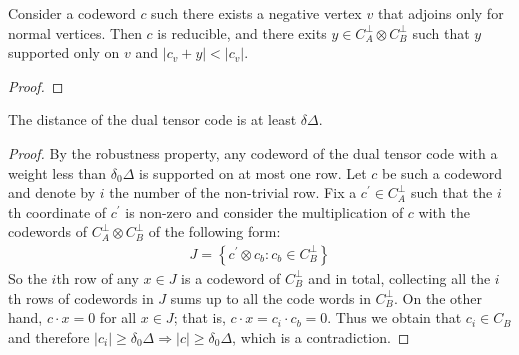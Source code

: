 \begin{claim}
  Consider a codeword $c$ such there exists a negative vertex $v$ that adjoins only for normal vertices. Then $c$ is reducible, and there exits $y \in C_{A}^{\perp}\otimes C_{B}^{\perp}$ such that $y$ supported only on $v$ and $ | c_{v} + y | < |c_{v}| $.       
\end{claim}

\begin{proof}
\end{proof}




\begin{claim}
  The distance of the dual tensor code is at least $\delta\Delta$.
\end{claim}
\begin{proof}
By the robustness property, any codeword of the dual tensor code with a weight less than $\delta_{0}\Delta$ is supported on at most one row. Let $c$ be such a codeword and denote by $i$ the number of the non-trivial row. Fix a $c^{\prime} \in C_{A}^{\perp}$ such that the $i$th coordinate of  $c^{\prime}$ is non-zero and consider the multiplication of $c$ with the codewords of $C_{A}^\perp \otimes C_{B}^\perp$ of the following form:
  \begin{equation*}
    \begin{split}
      J = \left\{ c^{\prime} \otimes c_{b} : c_{b}\in C_{B}^{\perp} \right\} 
    \end{split}
  \end{equation*}
  So the $i$th row of any $x \in J$ is a codeword of $C_{B}^{\perp}$ and in total, collecting all the $i$th rows of codewords in $J$ sums up to all the code words in $C_{B}^{\perp}$. On the other hand, $c\cdot x = 0$ for all $x \in J$; that is, $c\cdot x = c_{i} \cdot c_{b} = 0$. Thus we obtain that $c_{i} \in C_{B}$ and therefore $|c_{i}| \ge \delta_{0}\Delta \Rightarrow |c| \ge \delta_{0}\Delta$, which is a contradiction.
\end{proof}

